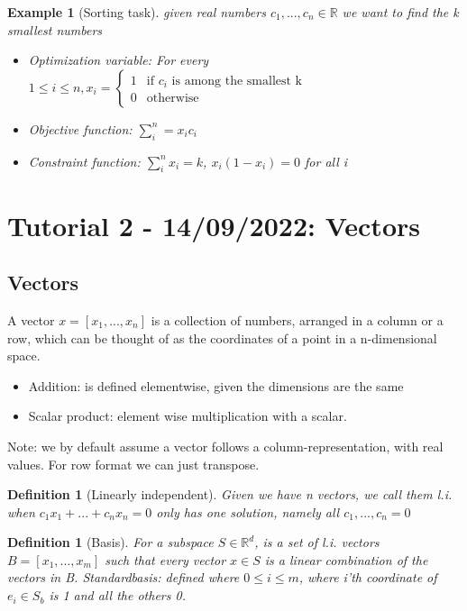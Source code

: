 \documentclass[11pt]{article}
\newtheorem{definition}[theorem]{Definition}
\newtheorem{example}[theorem]{Example}
\begin{document}
\begin{example}[Sorting task] given real numbers $c_1, ..., c_n \in \mathbb{R}$ we want to find the k smallest numbers
\begin{itemize}
    \item Optimization variable: For every $1 \leq i \leq n, x_i = \begin{cases}
        1 & \text{if $c_i$ is among the smallest k} \\
        0 & \text{otherwise}
    \end{cases}$ 
    \item Objective function: $\sum_i^n = x_i c_i$
    \item Constraint function: $\sum_i^n x_i = k$, $x_i(1-x_i) = 0$ for all i  
    
\end{itemize} 
    
\end{example}

\section{Tutorial 2 -  14/09/2022: Vectors}
\subsection{Vectors}
A vector $ x= [x_1, ..., x_n]$ is a collection of numbers, arranged in a column or a row, which can be thought of as the coordinates of a point in a n-dimensional space. 
\begin{itemize}
    \item Addition: is defined elementwise, given the dimensions are the same
    \item Scalar product: element wise multiplication with a scalar.
\end{itemize}

Note: we by default assume a vector follows a column-representation, with real values. For row format we can just transpose. 

\begin{definition}[Linearly independent]
    Given we have n vectors, we call them l.i. when $c_1 x_1 + ... + c_n x_n = 0$ only has one solution, namely all $c_1, ..., c_n = 0$
\end{definition}

\begin{definition}[Basis]
    For a subspace $S \in \mathbb{R}^d$, is a set of l.i. vectors $B = [x_1, ..., x_m]$ such that every vector $x \in S$ is a linear combination of the vectors in B.   \newline
    Standardbasis: defined where $0 \leq i \leq m$, where i'th coordinate of $e_i \in S_b$ is 1 and all the others 0.  
\end{definition}
\end{document}
